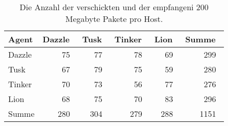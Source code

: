\begin{table}
\centering
\begin{tabular}{l%
 r<{\,}%
 r<{\,}%
 r<{\,}%
 r<{\,}%
 r<{\,}%
}
Agent  				& Dazzle	& Tusk		& Tinker	& Lion		& Summe		\\
\hline
Dazzle 				& 75		& 77		& 78		& 69		& 299		\\
Tusk 				& 67		& 79		& 75		& 59		& 280		\\
Tinker				& 70		& 73		& 56		& 77		& 276		\\
Lion				& 68		& 75		& 70		& 83		& 296		\\ 
Summe				& 280		& 304		& 279 		& 288		& 1151		\\
\end{tabular}
\caption{Die Anzahl der verschickten und der empfangeni 200 Megabyte Pakete pro Host.}
\label{tab:VerschicktePakete200Mb}
\end{table}



